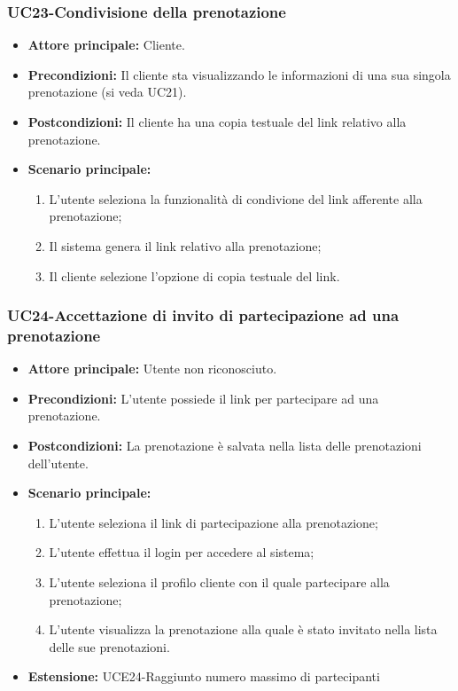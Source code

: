 \subsubsection{UC23-Condivisione della prenotazione}
\begin{itemize}
    \item \textbf{Attore principale: } Cliente.
    \item \textbf{Precondizioni: }Il cliente sta visualizzando le informazioni di una sua singola prenotazione (si veda UC21).
    \item \textbf{Postcondizioni: }Il cliente ha una copia testuale del link relativo alla prenotazione.
    \item \textbf{Scenario principale:} 
        \begin{enumerate}
            \item L'utente seleziona la funzionalità di condivione del link afferente alla prenotazione;
            \item Il sistema genera il link relativo alla prenotazione;
            \item Il cliente selezione l'opzione di copia testuale del link.
        \end{enumerate}
\end{itemize}

\subsubsection{UC24-Accettazione di invito di partecipazione ad una prenotazione}
\begin{itemize}
    \item \textbf{Attore principale: } Utente non riconosciuto.
    \item \textbf{Precondizioni: }L'utente possiede il link per partecipare ad una prenotazione.
    \item \textbf{Postcondizioni: }La prenotazione è salvata nella lista delle prenotazioni dell'utente.
    \item \textbf{Scenario principale:} 
        \begin{enumerate}
            \item L'utente seleziona il link di partecipazione alla prenotazione;
            \item L'utente effettua il login per accedere al sistema;
            \item L'utente seleziona il profilo cliente con il quale partecipare alla prenotazione;
            \item L'utente visualizza la prenotazione alla quale è stato invitato nella lista delle sue
            prenotazioni.
        \end{enumerate}
        \item \textbf{Estensione: }UCE24-Raggiunto numero massimo di partecipanti
    \end{itemize}

